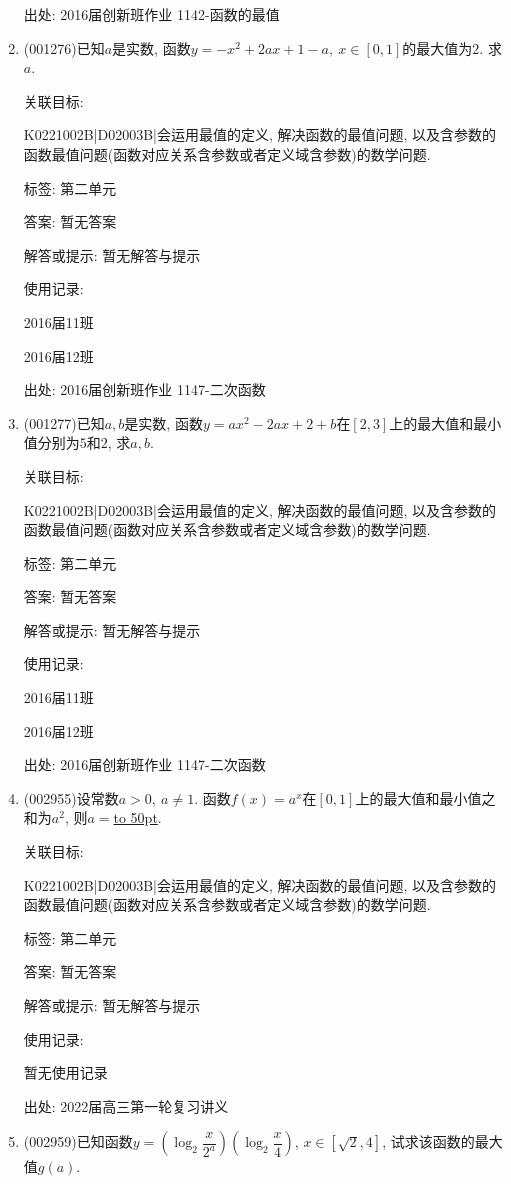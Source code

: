 \documentclass[10pt,a4paper]{article}
\newcommand{\blank}[1]{\underline{\hbox to #1pt{}}}
\begin{document}
\begin{enumerate}[1.]
出处: 2016届创新班作业	1142-函数的最值
\item { (001276)}已知$a$是实数, 函数$y=-x^2+2ax+1-a, \ x \in [0,1]$的最大值为$2$. 求$a$.


关联目标:

K0221002B|D02003B|会运用最值的定义, 解决函数的最值问题, 以及含参数的函数最值问题(函数对应关系含参数或者定义域含参数)的数学问题.



标签: 第二单元

答案: 暂无答案

解答或提示: 暂无解答与提示

使用记录:

2016届11班	

2016届12班	


出处: 2016届创新班作业	1147-二次函数
\item { (001277)}已知$a,b$是实数, 函数$y=ax^2-2ax+2+b$在$[2,3]$上的最大值和最小值分别为$5$和$2$, 求$a,b$.


关联目标:

K0221002B|D02003B|会运用最值的定义, 解决函数的最值问题, 以及含参数的函数最值问题(函数对应关系含参数或者定义域含参数)的数学问题.



标签: 第二单元

答案: 暂无答案

解答或提示: 暂无解答与提示

使用记录:

2016届11班	

2016届12班	


出处: 2016届创新班作业	1147-二次函数
\item { (002955)}设常数$a>0,\ a\ne 1$. 函数$f(x)=a^x$在$[0,1]$上的最大值和最小值之和为$a^2$, 则$a=$\blank{50}.


关联目标:

K0221002B|D02003B|会运用最值的定义, 解决函数的最值问题, 以及含参数的函数最值问题(函数对应关系含参数或者定义域含参数)的数学问题.



标签: 第二单元

答案: 暂无答案

解答或提示: 暂无解答与提示

使用记录:

暂无使用记录


出处: 2022届高三第一轮复习讲义
\item { (002959)}已知函数$y=(\log_2\dfrac x{2^a})(\log_2\dfrac x4)$, $x\in [\sqrt 2,4]$, 试求该函数的最大值$g(a)$.



\end{enumerate}
\end{document}

